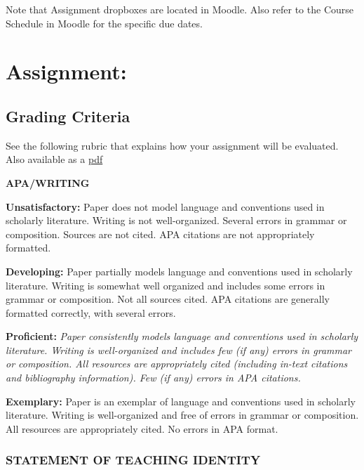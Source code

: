 \documentclass[
]{book}
\begin{document}
Note that Assignment dropboxes are located in Moodle. Also refer to the Course Schedule in Moodle for the specific due dates.

\hypertarget{assignment}{%
\section*{Assignment:}\label{assignment}}

\hypertarget{grading-criteria}{%
\subsection*{Grading Criteria}\label{grading-criteria}}

See the following rubric that explains how your assignment will be evaluated. Also available as a \href{assets/assessment/Identity-as-a-Teacher-RUBRIC.pdf}{pdf}

\textbf{APA/WRITING}

\textbf{Unsatisfactory:} Paper does not model language and conventions used in scholarly literature. Writing is not well-organized. Several errors in grammar or composition. Sources are not cited. APA citations are not appropriately formatted.

\textbf{Developing:} Paper partially models language and conventions used in scholarly literature. Writing is somewhat well organized and includes some errors in grammar or composition. Not all sources cited. APA citations are generally formatted correctly, with several errors.

\textbf{Proficient:} \emph{Paper consistently models language and conventions used in scholarly literature. Writing is well-organized and includes few (if any) errors in grammar or composition. All resources are appropriately cited (including in-text citations and bibliography information). Few (if any) errors in APA citations.}

\textbf{Exemplary:} Paper is an exemplar of language and conventions used in scholarly literature. Writing is well-organized and free of errors in grammar or composition. All resources are appropriately cited. No errors in APA format.

\hypertarget{statement-of-teaching-identity}{%
\subsubsection*{STATEMENT OF TEACHING IDENTITY}\label{statement-of-teaching-identity}}
\end{document}
